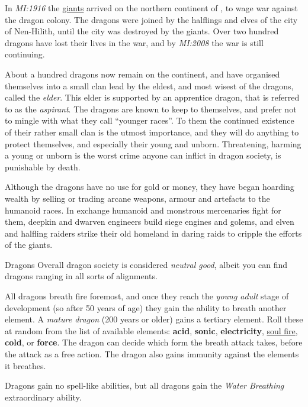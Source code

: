 In \emph{MI:1916} the \hyperref[sec:Giants]{giants} arrived on the northern
continent of , to wage war against the dragon colony. The
dragons were joined by the halflings and elves of the city of Nen-Hilith,
until the city was destroyed by the giants. Over two hundred dragons have lost
their lives in the war, and by \emph{MI:2008} the war is still continuing.

About a hundred dragons now remain on the continent, and have organised
themselves into a small clan lead by the eldest, and most wisest of the
dragons, called the \emph{elder}. This elder is supported by an apprentice
dragon, that is referred to as the \emph{aspirant}. The dragons are known to
keep to themselves, and prefer not to mingle with what they call ``younger
races''. To them the continued existence of their rather small clan is the
utmost importance, and they will do anything to protect themselves, and
especially their young and unborn. Threatening, harming a young or unborn is
the worst crime anyone can inflict in dragon society, is punishable by death.

Although the dragons have no use for gold or money, they have began hoarding
wealth by selling or trading arcane weapons, armour and artefacts to the
humanoid races. In exchange humanoid and monstrous mercenaries fight for them,
deepkin and dwarven engineers build siege engines and golems, and elven and
halfling raiders strike their old homeland in daring raids to cripple the
efforts of the giants.

\begin{35e}{Dragons}
  Overall dragon society is considered \emph{neutral good}, albeit you can
  find dragons ranging in all sorts of alignments.

  All dragons breath fire foremost, and once they reach the \emph{young adult}
  stage of development (so after 50 years of age) they gain the ability to
  breath another element. A \emph{mature dragon} (200 years or older) gains a
  tertiary element. Roll these at random from the list of available elements:
  \textbf{acid}, \textbf{sonic}, \textbf{electricity}, \hyperref[sec:Soul
    Fire]{soul fire}, \textbf{cold}, or \textbf{force}. The dragon can decide
  which form the breath attack takes, before the attack as a free action. The
  dragon also gains immunity against the elements it breathes.

  Dragons gain no spell-like abilities, but all dragons gain the
  \emph{Water Breathing} extraordinary ability.
\end{35e}
